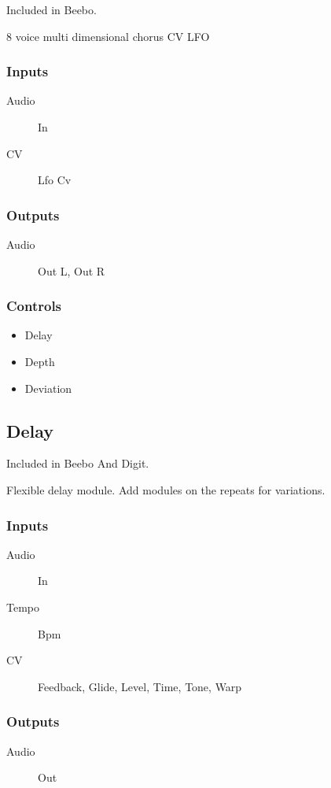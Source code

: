 Included in Beebo.

8 voice multi dimensional chorus CV LFO



\subsubsection{Inputs}
\begin{description}
\item [Audio] In
\item [CV] Lfo Cv
\end{description}

\subsubsection{Outputs}
\begin{description}
\item [Audio] Out L, Out R
\end{description}

\subsubsection{Controls}
\begin{itemize}
\item Delay
\item Depth
\item Deviation
\end{itemize}

\subsection{Delay}

Included in Beebo And Digit.

Flexible delay module. Add modules on the repeats for variations.



\subsubsection{Inputs}
\begin{description}
\item [Audio] In
\item [Tempo] Bpm
\item [CV] Feedback, Glide, Level, Time, Tone, Warp
\end{description}

\subsubsection{Outputs}
\begin{description}
\item [Audio] Out
\end{description}

